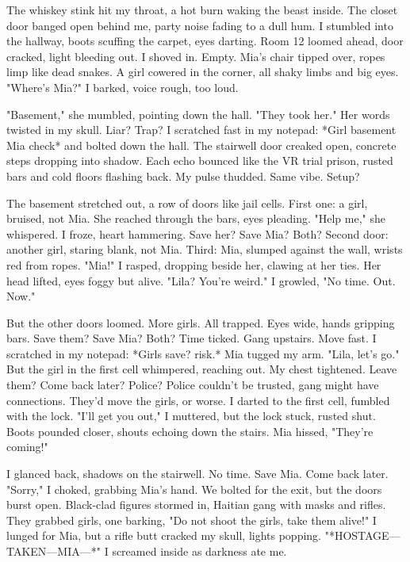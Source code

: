 \documentclass{article}
\begin{document}
The whiskey stink hit my throat, a hot burn waking the beast inside. The closet door banged open behind me, party noise fading to a dull hum. I stumbled into the hallway, boots scuffing the carpet, eyes darting. Room 12 loomed ahead, door cracked, light bleeding out. I shoved in. Empty. Mia's chair tipped over, ropes limp like dead snakes. A girl cowered in the corner, all shaky limbs and big eyes. "Where's Mia?" I barked, voice rough, too loud.

"Basement," she mumbled, pointing down the hall. "They took her." Her words twisted in my skull. Liar? Trap? I scratched fast in my notepad: *Girl basement Mia check* and bolted down the hall. The stairwell door creaked open, concrete steps dropping into shadow. Each echo bounced like the VR trial prison, rusted bars and cold floors flashing back. My pulse thudded. Same vibe. Setup?

The basement stretched out, a row of doors like jail cells. First one: a girl, bruised, not Mia. She reached through the bars, eyes pleading. "Help me," she whispered. I froze, heart hammering. Save her? Save Mia? Both? Second door: another girl, staring blank, not Mia. Third: Mia, slumped against the wall, wrists red from ropes. "Mia!" I rasped, dropping beside her, clawing at her ties. Her head lifted, eyes foggy but alive. "Lila? You're weird." I growled, "No time. Out. Now."

But the other doors loomed. More girls. All trapped. Eyes wide, hands gripping bars. Save them? Save Mia? Both? Time ticked. Gang upstairs. Move fast. I scratched in my notepad: *Girls save? risk.* Mia tugged my arm. "Lila, let's go." But the girl in the first cell whimpered, reaching out. My chest tightened. Leave them? Come back later? Police? Police couldn't be trusted, gang might have connections. They'd move the girls, or worse. I darted to the first cell, fumbled with the lock. "I'll get you out," I muttered, but the lock stuck, rusted shut. Boots pounded closer, shouts echoing down the stairs. Mia hissed, "They're coming!"

I glanced back, shadows on the stairwell. No time. Save Mia. Come back later. "Sorry," I choked, grabbing Mia's hand. We bolted for the exit, but the doors burst open. Black-clad figures stormed in, Haitian gang with masks and rifles. They grabbed girls, one barking, "Do not shoot the girls, take them alive!" I lunged for Mia, but a rifle butt cracked my skull, lights popping. "*HOSTAGE—TAKEN—MIA—*" I screamed inside as darkness ate me.
\end{document}
